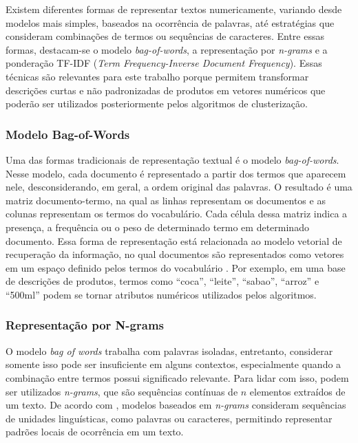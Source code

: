 \documentclass[english,brazilian]{UNISINOSmonografia}
\begin{document}
Existem diferentes formas de representar textos numericamente, variando desde modelos mais simples, baseados na ocorrência de palavras, até estratégias que consideram combinações de termos ou sequências de caracteres. Entre essas formas, destacam-se o modelo \textit{bag-of-words}, a representação por \textit{n-grams} e a ponderação TF-IDF (\textit{Term Frequency-Inverse Document Frequency}). Essas técnicas são relevantes para este trabalho porque permitem transformar descrições curtas e não padronizadas de produtos em vetores numéricos que poderão ser utilizados posteriormente pelos algoritmos de clusterização.

\subsubsection{Modelo Bag-of-Words}

Uma das formas tradicionais de representação textual é o modelo \textit{bag-of-words}. Nesse modelo, cada documento é representado a partir dos termos que aparecem nele, desconsiderando, em geral, a ordem original das palavras. O resultado é uma matriz documento-termo, na qual as linhas representam os documentos e as colunas representam os termos do vocabulário. Cada célula dessa matriz indica a presença, a frequência ou o peso de determinado termo em determinado documento. Essa forma de representação está relacionada ao modelo vetorial de recuperação da informação, no qual documentos são representados como vetores em um espaço definido pelos termos do vocabulário \cite{manning2008informationretrieval}. Por exemplo, em uma base de descrições de produtos, termos como ``coca'', ``leite'', ``sabao'', ``arroz'' e ``500ml'' podem se tornar atributos numéricos utilizados pelos algoritmos. 

\subsubsection{Representação por N-grams}

O modelo \textit{bag of words} trabalha com palavras isoladas, entretanto, considerar somente isso pode ser insuficiente em alguns contextos, especialmente quando a combinação entre termos possui significado relevante. Para lidar com isso, podem ser utilizados \textit{n-grams}, que são sequências contínuas de $n$ elementos extraídos de um texto. De acordo com \cite{jurafsky2025speech}, modelos baseados em \textit{n-grams} consideram sequências de unidades linguísticas, como palavras ou caracteres, permitindo representar padrões locais de ocorrência em um texto.
\end{document}
